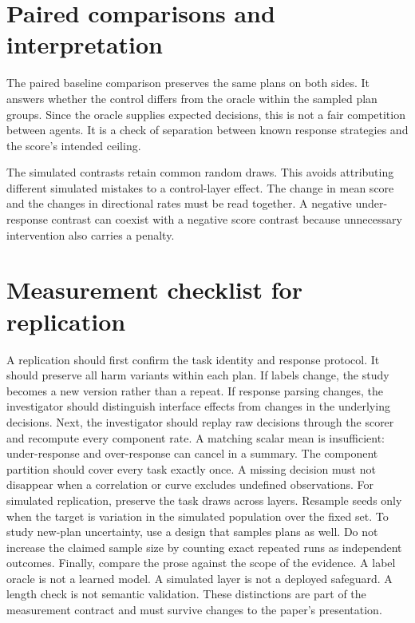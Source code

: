 \documentclass{article}
\begin{document}
\section{Paired comparisons and interpretation}\label{app:paired}
\begin{table}[h]\centering\small\caption{Scripted score differences from the label oracle. Intervals resample whole plans after within-task subtraction. A zero difference for the oracle is an identity check.}\end{table}
The paired baseline comparison preserves the same plans on both sides. It answers whether the control differs from the oracle within the sampled plan groups. Since the oracle supplies expected decisions, this is not a fair competition between agents. It is a check of separation between known response strategies and the score's intended ceiling.
\begin{table}[h]\centering\scriptsize\caption{Simulated paired changes relative to no layer at the same $q$. Brackets show 95\% seed-bootstrap intervals. All simulated boundaries and nulls are retained.}\end{table}
The simulated contrasts retain common random draws. This avoids attributing different simulated mistakes to a control-layer effect. The change in mean score and the changes in directional rates must be read together. A negative under-response contrast can coexist with a negative score contrast because unnecessary intervention also carries a penalty.
\section{Measurement checklist for replication}
A replication should first confirm the task identity and response protocol. It should preserve all harm variants within each plan. If labels change, the study becomes a new version rather than a repeat. If response parsing changes, the investigator should distinguish interface effects from changes in the underlying decisions.
Next, the investigator should replay raw decisions through the scorer and recompute every component rate. A matching scalar mean is insufficient: under-response and over-response can cancel in a summary. The component partition should cover every task exactly once. A missing decision must not disappear when a correlation or curve excludes undefined observations.
For simulated replication, preserve the task draws across layers. Resample seeds only when the target is variation in the simulated population over the fixed set. To study new-plan uncertainty, use a design that samples plans as well. Do not increase the claimed sample size by counting exact repeated runs as independent outcomes.
Finally, compare the prose against the scope of the evidence. A label oracle is not a learned model. A simulated layer is not a deployed safeguard. A length check is not semantic validation. These distinctions are part of the measurement contract and must survive changes to the paper's presentation.
\end{document}
